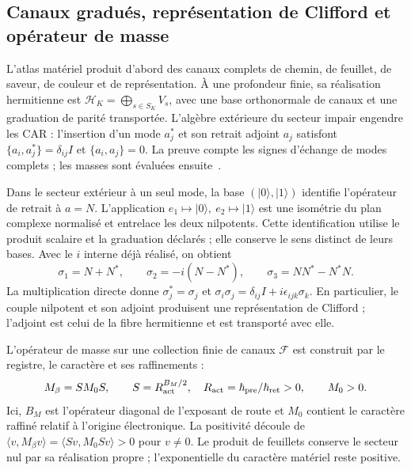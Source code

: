 \subsection{Canaux gradués, représentation de Clifford et opérateur de masse}

L'atlas matériel produit d'abord des canaux complets de chemin, de feuillet, de saveur, de couleur et de représentation. À une profondeur finie, sa réalisation hermitienne est \(\mathcal H_K=\bigoplus_{s\in S_K}V_s\), avec une base orthonormale de canaux et une graduation de parité transportée. L'algèbre extérieure du secteur impair engendre les CAR : l'insertion d'un mode \(a_j^*\) et son retrait adjoint \(a_j\) satisfont \(\{a_i,a_j^*\}=\delta_{ij}I\) et \(\{a_i,a_j\}=0\). La preuve compte les signes d'échange de modes complets ; les masses sont évaluées ensuite~\cite{hmtVI}.

Dans le secteur extérieur à un seul mode, la base \((|0\rangle,|1\rangle)\)
identifie l’opérateur de retrait à
\(a=N\). L’application \(e_1\mapsto|0\rangle,\ e_2\mapsto|1\rangle\)
est une isométrie du plan complexe normalisé et entrelace les deux
nilpotents. Cette identification utilise le produit scalaire et la
graduation déclarés ; elle conserve le sens distinct de leurs bases.
Avec le \(i\) interne déjà réalisé, on obtient
\begin{equation}
 \sigma_1=N+N^*,\qquad
 \sigma_2=-i(N-N^*),\qquad
 \sigma_3=NN^*-N^*N.
 \label{eq:hc-pauli}
\end{equation}
La multiplication directe donne
\(\sigma_j^*=\sigma_j\) et
\(\sigma_i\sigma_j=\delta_{ij}I+i\epsilon_{ijk}\sigma_k\).
En particulier, le couple nilpotent et son adjoint produisent une
représentation de Clifford ; l’adjoint est celui de la fibre hermitienne et
est transporté avec elle.

L'opérateur de masse sur une collection finie de canaux \(\mathcal F\) est construit par le registre, le caractère et ses raffinements :
\begin{equation}
 M_\beta=S M_0 S,\qquad
 S=R_{\rm act}^{B_M/2},\quad
 R_{\rm act}=\hbar_{\rm pre}/\hbar_{\rm ret}>0,
 \qquad M_0>0.
 \label{eq:hc-mass}
\end{equation}
Ici, \(B_M\) est l’opérateur diagonal de l’exposant de route et \(M_0\)
contient le caractère raffiné relatif à l’origine électronique.
La positivité découle de \(\langle v,M_\beta v\rangle
=\langle Sv,M_0Sv\rangle>0\) pour \(v\ne0\).
Le produit de feuillets conserve le secteur nul par sa réalisation propre ;
l’exponentielle du caractère matériel reste positive.

